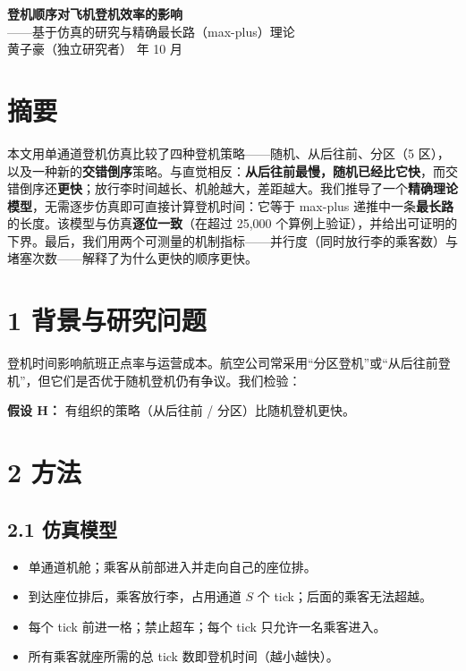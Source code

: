 \documentclass[
  11pt,
  UTF8,
  fontset=windows]{ctexart}
\author{}
\date{}
\providecommand{\tightlist}{%
  \setlength{\itemsep}{0pt}\setlength{\parskip}{0pt}}
\begin{document}
\begin{center}
{\LARGE\bfseries 登机顺序对飞机登机效率的影响}\\[4pt]
{\large ——基于仿真的研究与精确最长路（max-plus）理论}\\[8pt]
黄子豪（独立研究者） 年 10 月
\end{center}
\vspace{6pt}

\section{摘要}\label{ux6458ux8981}

本文用单通道登机仿真比较了四种登机策略------随机、从后往前、分区（5
区），以及一种新的\textbf{交错倒序}策略。与直觉相反：\textbf{从后往前最慢，随机已经比它快}，而交错倒序还\textbf{更快}；放行李时间越长、机舱越大，差距越大。我们推导了一个\textbf{精确理论模型}，无需逐步仿真即可直接计算登机时间：它等于
max-plus
递推中一条\textbf{最长路}的长度。该模型与仿真\textbf{逐位一致}（在超过
25,000
个算例上验证），并给出可证明的下界。最后，我们用两个可测量的机制指标------并行度（同时放行李的乘客数）与堵塞次数------解释了为什么更快的顺序更快。

\section{1
背景与研究问题}\label{ux80ccux666fux4e0eux7814ux7a76ux95eeux9898}

登机时间影响航班正点率与运营成本。航空公司常采用``分区登机''或``从后往前登机''，但它们是否优于随机登机仍有争议。我们检验：

\textbf{假设 H：} 有组织的策略（从后往前 / 分区）比随机登机更快。

\section{2 方法}\label{ux65b9ux6cd5}

\subsection{2.1 仿真模型}\label{ux4effux771fux6a21ux578b}

\begin{itemize}
\tightlist
\item
  单通道机舱；乘客从前部进入并走向自己的座位排。
\item
  到达座位排后，乘客放行李，占用通道 \(S\) 个 tick；后面的乘客无法超越。
\item
  每个 tick 前进一格；禁止超车；每个 tick 只允许一名乘客进入。
\item
  所有乘客就座所需的总 tick 数即登机时间（越小越快）。
\end{itemize}
\end{document}
